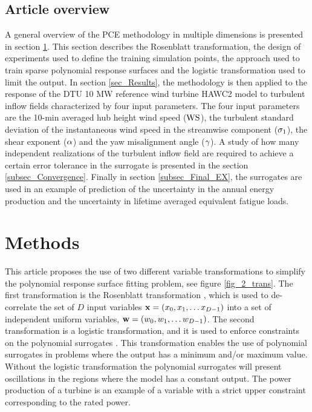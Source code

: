\documentclass[preprint,12pt]{elsarticle}
\begin{document}
\subsection{Article overview}

A general overview of the PCE methodology in multiple dimensions is presented in section \ref{sec_Methods}. This section describes the Rosenblatt transformation, the design of experiments used to define the training simulation points, the approach used to train sparse polynomial response surfaces and the logistic transformation used to limit the output. In section \ref{sec_Results}, the methodology is then applied to the response of the DTU 10 MW reference wind turbine HAWC2 model \cite{bak2012light} to turbulent inflow fields characterized by four input parameters. The four input parameters are the 10-min averaged hub height wind speed ($\text{WS}$), the turbulent standard deviation of the instantaneous wind speed in the streamwise component ($\sigma_{1}$), the shear exponent ($\alpha$) and the yaw misalignment angle ($\gamma$). A study of how many independent realizations of the turbulent inflow field are required to achieve a certain error tolerance in the surrogate is presented in the section \ref{subsec_Convergence}. Finally in section \ref{subsec_Final_EX}, the surrogates are used in an example of prediction of the uncertainty in the annual energy production and the uncertainty in lifetime averaged equivalent fatigue loads.

\section{Methods}
\label{sec_Methods}

This article proposes the use of two different variable transformations to simplify the polynomial response surface fitting problem, see figure \ref{fig_2_trans}. The first transformation is the Rosenblatt transformation \cite{rosenblatt1952}, which is used to de-correlate the set of $D$ input variables $\mathbf{x} = (x_0, x_1, \ldots x_{D-1})$ into a set of independent uniform variables, $\mathbf{w} = (w_0, w_1, \ldots w_{D-1})$. The second transformation is a logistic transformation, and it is used to enforce constraints on the polynomial surrogates \cite{simard1998transformation}. This transformation enables the use of polynomial surrogates in problems where the output has a minimum and/or maximum value. Without the logistic transformation the polynomial surrogates will present oscillations in the regions where the model has a constant output. The power production of a turbine is an example of a variable with a strict upper constraint corresponding to the rated power.
\end{document}
